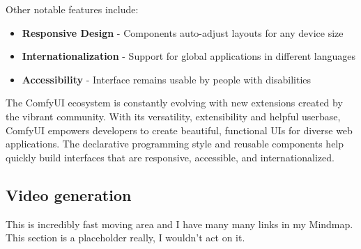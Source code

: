 Other notable features include:

\begin{itemize}
\item \textbf{Responsive Design} - Components auto-adjust layouts for any device size
\item \textbf{Internationalization} - Support for global applications in different languages
\item \textbf{Accessibility} - Interface remains usable by people with disabilities
\end{itemize}

The ComfyUI ecosystem is constantly evolving with new extensions created by the vibrant community. With its versatility, extensibility and helpful userbase, ComfyUI empowers developers to create beautiful, functional UIs for diverse web applications. The declarative programming style and reusable components help quickly build interfaces that are responsive, accessible, and internationalized. 

\subsection{Video generation}


This is incredibly fast moving area and I have many many links in my Mindmap. This section is a placeholder really, I wouldn't act on it.

